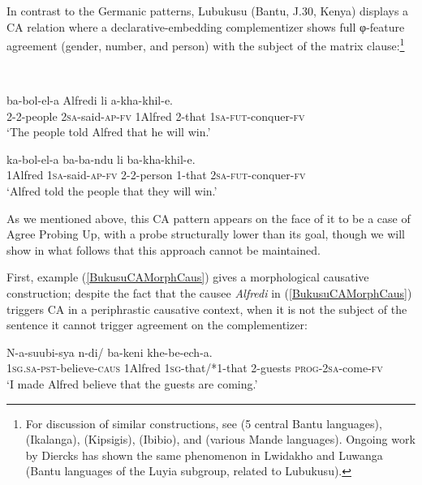 In contrast to the Germanic patterns, Lubukusu (Bantu, J.30, Kenya) displays a CA relation where a declarative-embedding complementizer shows full φ-feature agreement (gender, number, and person) with the subject of the matrix clause:\footnote{For discussion of similar constructions, see \citet{Kawasha:2007} (5 central Bantu languages), \citet{LetsholoSafir:2017} (Ikalanga), \citet{DiercksRao:2017} (Kipsigis), \citet{Torrence:2016} (Ibibio), and \citet{Idiatov:2010} (various Mande languages). Ongoing work by Diercks has shown the same phenomenon in Lwidakho and Luwanga (Bantu languages of the Luyia subgroup, related to Lubukusu).}

\ea \label{FirstLubukusuExample}
 \\

\begin{xlist}

\ex
\gll {} ba-bol-el-a Alfredi li	a-kha-khil-e. \\
2-2-people 2\textsc{sa}-said-\textsc{ap}-\textsc{fv} 1Alfred 2-that 1\textsc{sa}-\textsc{fut}-conquer-\textsc{fv} \\
\glt `The people told Alfred that he will win.' 

\ex
\gll {} ka-bol-el-a ba-ba-ndu li ba-kha-khil-e. \\
1Alfred 1\textsc{sa}-said-\textsc{ap}-\textsc{fv} 2-2-person 1-that 2\textsc{sa}-\textsc{fut}-conquer-\textsc{fv} \\
\glt `Alfred told the people that they will win.'

\end{xlist}

\z

\noindent As we mentioned above, this CA pattern appears on the face of it to be a case of Agree Probing Up, with a probe structurally lower than its goal, though we will show in what follows that this approach cannot be maintained.

First, example (\ref{BukusuCAMorphCaus}) gives a morphological causative construction; despite the fact that the causee \textit{Alfredi} in (\ref{BukusuCAMorphCaus}) triggers CA in a periphrastic causative context, when it is not the subject of the sentence it cannot trigger agreement on the complementizer:

\ea \label{BukusuCAMorphCaus}
\gll N-a-suubi-sya  n-di/ ba-keni khe-be-ech-a. \\
1\textsc{sg}.\textsc{sa}-\textsc{pst}-believe-\textsc{caus} 1Alfred 1\textsc{sg}-that/*1-that 2-guests \textsc{prog}-2\textsc{sa}-come-\textsc{fv} \\
\glt `I made Alfred believe that the guests are coming.'
\z

